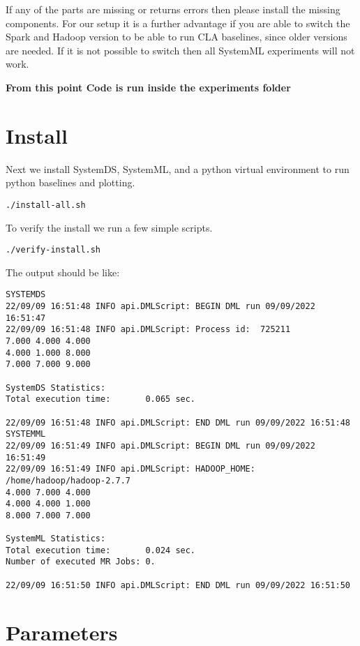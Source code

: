 \documentclass{readme}
\begin{document}
If any of the parts are missing or returns errors then please install the missing components.
For our setup it is a further advantage if you are able to switch the Spark and Hadoop version to
be able to run CLA baselines, since older versions are needed. If it is not possible to switch then all SystemML experiments will not work.

\vspace{1cm}
\noindent
\textbf{From this point Code is run inside the experiments folder}
\vspace{1cm}

\newpage


\section{Install}

Next we install SystemDS, SystemML, and a python virtual environment to run python baselines and plotting.

\begin{lstlisting}
./install-all.sh
\end{lstlisting}

To verify the install we run a few simple scripts.

\begin{lstlisting}
./verify-install.sh 
\end{lstlisting}

The output should be like:

\begin{lstlisting}
SYSTEMDS
22/09/09 16:51:48 INFO api.DMLScript: BEGIN DML run 09/09/2022 16:51:47
22/09/09 16:51:48 INFO api.DMLScript: Process id:  725211
7.000 4.000 4.000
4.000 1.000 8.000
7.000 7.000 9.000

SystemDS Statistics:
Total execution time:		0.065 sec.

22/09/09 16:51:48 INFO api.DMLScript: END DML run 09/09/2022 16:51:48
SYSTEMML
22/09/09 16:51:49 INFO api.DMLScript: BEGIN DML run 09/09/2022 16:51:49
22/09/09 16:51:49 INFO api.DMLScript: HADOOP_HOME: /home/hadoop/hadoop-2.7.7
4.000 7.000 4.000
4.000 4.000 1.000
8.000 7.000 7.000

SystemML Statistics:
Total execution time:		0.024 sec.
Number of executed MR Jobs:	0.

22/09/09 16:51:50 INFO api.DMLScript: END DML run 09/09/2022 16:51:50    
\end{lstlisting}

\newpage

\section{Parameters}
\end{document}

